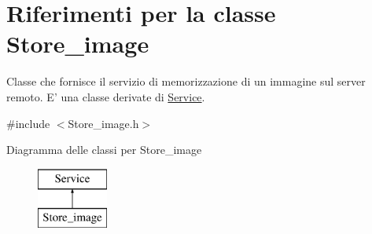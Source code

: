 \hypertarget{class_store__image}{\section{Riferimenti per la classe Store\-\_\-image}
\label{class_store__image}
}


Classe che fornisce il servizio di memorizzazione di un immagine sul server remoto. E' una classe derivate di {\ttfamily \hyperlink{class_service}{Service}}.  




{\ttfamily \#include $<$Store\-\_\-image.\-h$>$}

Diagramma delle classi per Store\-\_\-image\begin{figure}[H]
\begin{center}
\leavevmode
\includegraphics[height=2.000000cm]{class_store__image}
\end{center}
\end{figure}
